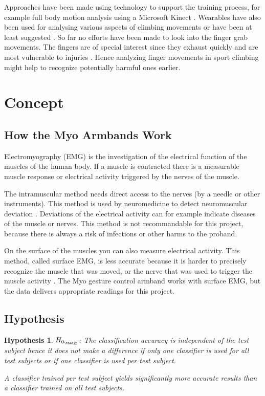 \documentclass[journal]{IEEEtran}
\newtheorem{hyp}{Hypothesis}
\begin{document}
Approaches have been made using technology to support the training process, for example full body motion analysis using a Microsoft Kinect \autocite{Cha201552,Kajastila:2014:ACI:2611780.2581139}. Wearables have also been used for analysing various aspects of climbing movements \autocite{Ladha:2013:CSA:2493432.2493492} or have been at least suggested \autocite{Kalyanaraman:2015:ARC:2800835.2800856}. So far no efforts have been made to look into the finger grab movements. The fingers are of special interest since they exhaust quickly and are most vulnerable to injuries \autocite{Wright01062001}. Hence analyzing finger movements in sport climbing might help to recognize potentially harmful ones earlier.

\section{Concept}

\subsection{How the Myo Armbands Work}
Electromyography (EMG) is the investigation of the electrical function of the muscles of the human body. If a muscle is contracted there is a measurable muscle response or electrical activity triggered by the nerves of the muscle.

The intramuscular method needs direct access to the nerves (by a needle or other instruments). This method is used by neuromedicine to detect neuromuscular deviation \autocite{neuromedicine}. Deviations of the electrical activity can for example indicate diseases of the muscle or nerves. This method is not recommandable for this project, because there is always a risk of infections or other harms to the proband.

On the surface of the muscles you can also measure electrical activity. This method, called surface EMG, is less accurate because it is harder to precisely recognize the muscle that was moved, or the nerve that was used to trigger the muscle activity \autocite{myoUniGoettingen}. The Myo gesture control armband works with surface EMG, but the data delivers appropriate readings for this project.

\subsection{Hypothesis}

\begin{hyp}\label{hyp:subject}
$H_{0_{\thehyp}}$: The classification accuracy is independent of the test subject hence it does not make a difference if only one classifier is used for all test subjects or if one classifier is used per test subject.

A classifier trained per test subject yields significantly more accurate results than a classifier trained on all test subjects.
\end{hyp}
\end{document}
